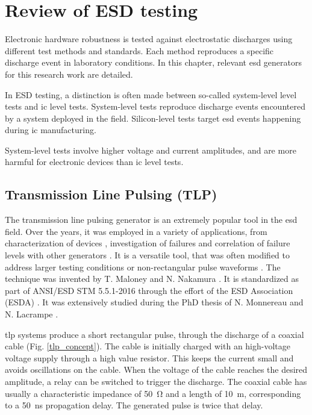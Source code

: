 \section{Review of ESD testing}
\label{sec:state-art-esd-testing}

Electronic hardware robustness is tested against electrostatic discharges using different test methods and standards.
Each method reproduces a specific discharge event in laboratory conditions.
In this chapter, relevant \gls{esd} generators for this research work are detailed.

In ESD testing, a distinction is often made between so-called system-level level tests and \gls{ic} level tests.
System-level tests reproduce discharge events encountered by a system deployed in the field.
Silicon-level tests target \gls{esd} events happening during \gls{ic} manufacturing.

System-level tests involve higher voltage and current amplitudes, and are more harmful for electronic devices than \gls{ic} level tests.

\subsection{Transmission Line Pulsing (TLP)}

The transmission line pulsing generator is an extremely popular tool in the \gls{esd} field.
Over the years, it was employed in a variety of applications, from characterization of devices \cite{TLPforESDProtectionCz, TLPthroubleshooting}, investigation of failures \cite{tlp-application-1, tlp-application-2} and correlation of failure levels with other generators \cite{correlation-system-level-esd-tlp}.
It is a versatile tool, that was often modified to address larger testing conditions \cite{tlp-power} or non-rectangular pulse waveforms \cite{tlp-based-hmm, my-publi-tlp-hmm}.
The technique was invented by T. Maloney and N. Nakamura \cite{TLP}.
It is standardized as part of ANSI/ESD STM 5.5.1-2016 \cite{tlp-standard} through the effort of the ESD Association (ESDA) \cite{esda}.
It was extensively studied during the PhD thesis of N. Monnereau \cite{phd-monnereau} and N. Lacrampe \cite{phd-lacrampe}.

\gls{tlp} systems produce a short rectangular pulse, through the discharge of a coaxial cable (Fig. \ref{tlp_concept}).
The cable is initially charged with an high-voltage voltage supply through a high value resistor.
This keeps the current small and avoids oscillations on the cable.
When the voltage of the cable reaches the desired amplitude, a relay can be switched to trigger the discharge.
The coaxial cable has usually a characteristic impedance of \SI{50}{\ohm} and a length of \SI{10}{\metre}, corresponding to a \SI{50}{\nano\second} propagation delay.
The generated pulse is twice that delay.


